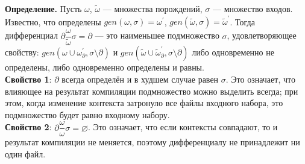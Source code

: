 \textbf{Определение.} Пусть $\omega$, $\tilde{\omega}$ --- множества порождений, $\sigma$ --- множество входов. Известно, что определены $gen(\omega, \sigma) = \omega^\prime$, $gen(\tilde{\omega}, \sigma) = \tilde{\omega}^\prime$. Тогда дифференциал $\partial\dfrac{\omega}{\tilde{\omega}}\sigma = \partial$ --- это наименьшее подмножество $\sigma$, удовлетворяющее свойству: 
$gen(\omega \cup \omega^\prime_{\partial}, \sigma\setminus\partial)$ и
$gen(\tilde{\omega} \cup \tilde{\omega}^\prime_{\partial}, \sigma\setminus\partial)$ либо одновременно не определены, либо одновременно определены и равны.\\

\textbf{Свойство 1}: $\partial$ всегда определён и в худшем случае равен $\sigma$. Это означает, что влияющее на результат компиляции подмножество можно выделить всегда; при этом, когда изменение контекста затронуло все файлы входного набора, это подмножество будет равно входному набору.\\

\textbf{Свойство 2}: $\partial\dfrac{\omega}{\omega}\sigma = \varnothing$. Это означает, что если контексты совпадают, то и результат компиляции не меняется, поэтому дифференциалу не принадлежит ни один файл.\\

\begin{comment}
	Вопрос: верно ли, что в условиях инкрементального случая (там, где $\Delta^\rho_\alpha\sigma$)

	$$\partial\dfrac{\omega_\rho}{\omega_\alpha}(\sigma\setminus\rho)\subseteq\xi$$ ?

	\textbf{Доказательство:}

	\newcommand{\mypart}{\partial\dfrac{\omega_\rho}{\omega_\alpha}(\sigma\setminus\rho)}

	Докажем, что если $s \in \sigma\setminus\rho$, $s \notin \xi$, то $s \notin \mypart$. Обозначим $\tau = (\sigma\setminus\rho)\setminus\mypart$, тогда $\tau$ --- наибольшее подмножество $\sigma\setminus\rho$, такое, что $gen(\omega_\rho, \tau)$ определено $\Leftrightarrow$ $gen(\omega_\alpha, \tau)$ определено. Предположим, $s \in \mypart$, тогда $s \notin \tau$. Рассмотрим $gen(\omega_\rho, \tau)$.
\end{comment}
